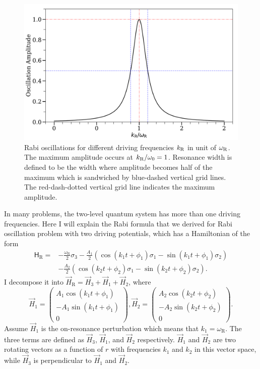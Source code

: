 \begin{figure}[htbp]
    \centering
    \includegraphics[width=\textwidth]{chapters/assets/app/rabi-resonance-width}
    \caption{Rabi oscillations for different driving frequencies $k_\mathrm R$ in unit of $\omega_\mathrm R$. The maximum amplitude occurs at $k_\mathrm R/\omega_0=1$. Resonance width is defined to be the width where amplitude becomes half of the maximum which is sandwiched by blue-dashed vertical grid lines. The red-dash-dotted vertical grid line indicates the maximum amplitude.}
    \label{app-fig:rabi-resonance-width}
\end{figure}


In many problems, the two-level quantum system has more than one driving frequencies. Here I will explain the Rabi formula that we derived for Rabi oscillation problem with two driving potentials, which has a Hamiltonian of the form
\begin{align*}
    \mathsf H_{\mathrm R} =& -\frac{\omega_{\mathrm R}}{2}\sigma_3 - \frac{A_{1} }{2}  \left( \cos(k_{1} t +\phi_{1})\sigma_1  - \sin(k_{1} t +\phi_{1}) \sigma_2\right) \nonumber\\
    & - \frac{A_{2} }{2}  \left( \cos(k_{2} t +\phi_{2})\sigma_1  - \sin(k_{2} t +\phi_{2}) \sigma_2\right).
\end{align*}
I decompose it into $\vec{H}_{\mathrm R}=\vec{H}_3 + \vec{H}_{1} + \vec{H}_2$, where
\begin{equation*}
    \vec{H}_1 =  \begin{pmatrix}
     A_{1} \cos(k_{1}t+\phi_{1}) \\
     -A_{1} \sin(k_{1}t+\phi_{1})  \\
     0
   \end{pmatrix},   \vec{H}_2 =  \begin{pmatrix}
     A_{2} \cos(k_{2}t+\phi_{2}) \\
     -A_{2} \sin(k_{2}t+\phi_{2})  \\
     0
      \end{pmatrix}.
\end{equation*}
Assume $\vec{H}_1$ is the on-resonance perturbation which means that $k_1 = \omega_{\mathrm{R}}$. The three terms are defined as $\vec H_3$, $\vec H_1$, and $\vec H_2$ respectively. $\vec H_1$ and $\vec H_2$ are two rotating vectors as a function of $r$ with frequencies $k_1$ and $k_2$ in this vector space, while $\vec H_3$ is perpendicular to $\vec H_1$ and $\vec H_2$.

